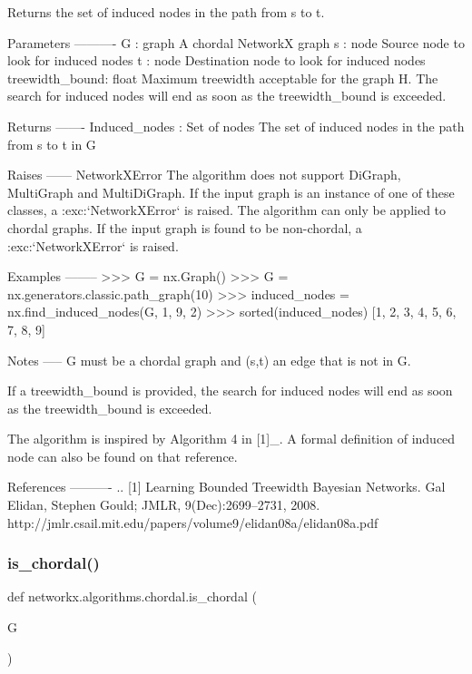 \begin{DoxyVerb}Returns the set of induced nodes in the path from s to t.

Parameters
----------
G : graph
  A chordal NetworkX graph
s : node
    Source node to look for induced nodes
t : node
    Destination node to look for induced nodes
treewidth_bound: float
    Maximum treewidth acceptable for the graph H. The search
    for induced nodes will end as soon as the treewidth_bound is exceeded.

Returns
-------
Induced_nodes : Set of nodes
    The set of induced nodes in the path from s to t in G

Raises
------
NetworkXError
    The algorithm does not support DiGraph, MultiGraph and MultiDiGraph.
    If the input graph is an instance of one of these classes, a
    :exc:`NetworkXError` is raised.
    The algorithm can only be applied to chordal graphs. If the input
    graph is found to be non-chordal, a :exc:`NetworkXError` is raised.

Examples
--------
>>> G = nx.Graph()
>>> G = nx.generators.classic.path_graph(10)
>>> induced_nodes = nx.find_induced_nodes(G, 1, 9, 2)
>>> sorted(induced_nodes)
[1, 2, 3, 4, 5, 6, 7, 8, 9]

Notes
-----
G must be a chordal graph and (s,t) an edge that is not in G.

If a treewidth_bound is provided, the search for induced nodes will end
as soon as the treewidth_bound is exceeded.

The algorithm is inspired by Algorithm 4 in [1]_.
A formal definition of induced node can also be found on that reference.

References
----------
.. [1] Learning Bounded Treewidth Bayesian Networks.
   Gal Elidan, Stephen Gould; JMLR, 9(Dec):2699--2731, 2008.
   http://jmlr.csail.mit.edu/papers/volume9/elidan08a/elidan08a.pdf
\end{DoxyVerb}
 \mbox{\label{namespacenetworkx_1_1algorithms_1_1chordal_a931ba6a80a30421b68ec4c3287ec4c2c}} 
\subsubsection{\texorpdfstring{is\+\_\+chordal()}{is\_chordal()}}
{\footnotesize\ttfamily def networkx.\+algorithms.\+chordal.\+is\+\_\+chordal (\begin{DoxyParamCaption}\item[{}]{G }\end{DoxyParamCaption})}

